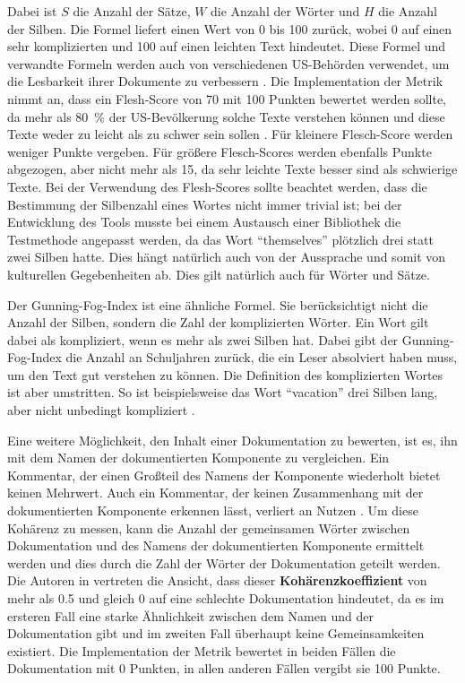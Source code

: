 Dabei ist $S$ die Anzahl der Sätze, $W$ die Anzahl der Wörter und $H$ die Anzahl der Silben. Die Formel liefert einen Wert von 0 bis 100 zurück, wobei 0 auf einen sehr komplizierten und 100 auf einen leichten Text hindeutet. Diese Formel und verwandte Formeln werden auch von verschiedenen US-Behörden verwendet, um die Lesbarkeit ihrer Dokumente zu verbessern \cite[S. 72]{AutomaticQualityAssessmentofSourceCodeComments:TheJavadocMiner}. Die Implementation der Metrik nimmt an, dass ein Flesh-Score von 70 mit 100 Punkten bewertet werden sollte, da mehr als 80~\% der US-Bevölkerung solche Texte verstehen können und diese Texte weder zu leicht als zu schwer sein sollen \cite[S. 22]{ThePrinciplesofReadability}. Für kleinere Flesch-Score werden weniger Punkte vergeben. Für größere Flesch-Scores werden ebenfalls Punkte abgezogen, aber nicht mehr als 15, da sehr leichte Texte besser sind als schwierige Texte. 
Bei der Verwendung des Flesh-Scores sollte beachtet werden, dass die Bestimmung der Silbenzahl eines Wortes nicht immer trivial ist; bei der Entwicklung des Tools musste bei einem Austausch einer Bibliothek die Testmethode angepasst werden, da das Wort \enquote{themselves} plötzlich drei statt zwei Silben hatte. Dies hängt natürlich auch von der Aussprache und somit von kulturellen Gegebenheiten ab. Dies gilt natürlich auch für Wörter und Sätze. 

Der Gunning-Fog-Index ist eine ähnliche Formel. Sie berücksichtigt nicht die Anzahl der Silben, sondern die Zahl der komplizierten Wörter. Ein Wort gilt dabei als kompliziert, wenn es mehr als zwei Silben hat. Dabei gibt der Gunning-Fog-Index die Anzahl an Schuljahren zurück, die ein Leser absolviert haben muss, um den Text gut verstehen zu können. Die Definition des komplizierten Wortes ist aber umstritten. So ist beispielsweise das Wort \enquote{vacation} drei Silben lang, aber nicht unbedingt kompliziert \cite[S. 10]{bogert1985defense}.

\bigskip
Eine weitere Möglichkeit, den Inhalt einer Dokumentation zu bewerten, ist es, ihn mit dem Namen der dokumentierten Komponente zu vergleichen. Ein Kommentar, der einen Großteil des Namens der Komponente wiederholt bietet keinen Mehrwert. Auch ein Kommentar, der keinen Zusammenhang mit der dokumentierten Komponente erkennen lässt, verliert an Nutzen \cite[S. 86]{Qualityanalysisofsourcecodecomments}.
Um diese Kohärenz zu messen, kann die Anzahl der gemeinsamen Wörter zwischen Dokumentation und des Namens der dokumentierten Komponente ermittelt werden und dies durch die Zahl der Wörter der Dokumentation geteilt werden. Die Autoren in \cite[S. 87]{Qualityanalysisofsourcecodecomments} vertreten die Ansicht, dass dieser \textbf{Kohärenzkoeffizient} von mehr als 0.5 und gleich 0 auf eine schlechte Dokumentation hindeutet, da es im ersteren Fall eine starke Ähnlichkeit zwischen dem Namen und der Dokumentation gibt und im zweiten Fall überhaupt keine Gemeinsamkeiten existiert. Die Implementation der Metrik bewertet in beiden Fällen die Dokumentation mit 0 Punkten, in allen anderen Fällen vergibt sie 100 Punkte.

